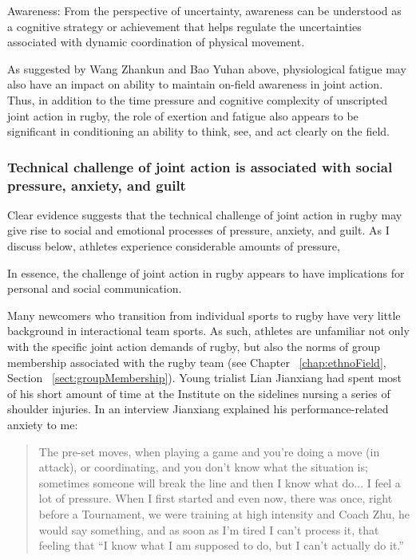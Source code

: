 \begin{CJK}{UTF8}{gbsn}
Awareness:
 From the perspective of uncertainty,  awareness can be understood as a cognitive strategy or achievement that helps regulate the uncertainties associated with dynamic coordination of physical movement.

As suggested by Wang Zhankun and Bao Yuhan above, physiological fatigue may also have an impact on ability to maintain on-field awareness in joint action.  Thus, in addition to the time pressure and cognitive complexity of unscripted joint action in rugby, the role of exertion and fatigue also appears to be significant in conditioning an ability to think, see, and act clearly on the field.



















\subsubsection{Technical challenge of joint action is associated with social pressure, anxiety, and guilt}

Clear evidence suggests that the technical challenge of joint action in rugby may give rise to social and emotional processes of pressure, anxiety, and guilt.  As I discuss below, athletes experience considerable amounts of pressure,

In essence, the challenge of joint action in rugby appears to have implications for personal and social communication.


Many newcomers who transition from  individual sports to rugby have very little background in interactional team sports.  As such, athletes are unfamiliar not only with the specific joint action demands of rugby, but also the norms of group membership associated with the rugby team (see Chapter ~\ref{chap:ethnoField}, Section ~\ref{sect:groupMembership}).  Young trialist Lian Jianxiang had spent most of his short amount of time at the Institute on the sidelines nursing a series of shoulder injuries. In an interview Jianxiang explained his performance-related anxiety to me:

    \begin{quote}
      The pre-set moves, when playing a game and you’re doing a move (in attack), or coordinating, and you don’t know what the situation is; sometimes someone will break the line and then I know what do... I feel a lot of pressure.  When I first started and even now, there was once, right before a Tournament, we were training at high intensity and Coach Zhu, he would say something, and as soon as I'm tired I can't process it, that feeling that ``I know what I am supposed to do, but I can't actually do it.''
    \end{quote}


\end{CJK}
